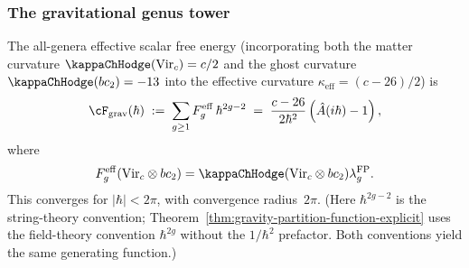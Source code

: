 \subsubsection*{The gravitational genus tower}

\begin{theorem}
\label{thm:gravity-genus-convergence}
The all-genera effective scalar free energy (incorporating both
the matter curvature $\kappaChHodge(\mathrm{Vir}_c) = c/2$ and the
ghost curvature $\kappaChHodge(bc_2) = -13$ into the effective
curvature $\kappa_{\mathrm{eff}} = (c-26)/2$) is
\begin{equation}\label{eq:gravity-all-genera}
\cF_{\mathrm{grav}}(\hbar)
\;:=\;
\sum_{g \ge 1}
F_g^{\mathrm{eff}}\,\hbar^{2g-2}
\;=\;
\frac{c-26}{2\hbar^2}
\left(
 \hat A(i\hbar) - 1
\right),
\end{equation}
where
\[
F_g^{\mathrm{eff}}(\mathrm{Vir}_c\otimes bc_2)
= \kappaChHodge(\mathrm{Vir}_c\otimes bc_2)\lambda_g^{\mathrm{FP}}.
\]
This
converges for $|\hbar| < 2\pi$, with convergence radius~$2\pi$.
\textup{(}Here $\hbar^{2g-2}$ is the string-theory convention;
Theorem~\textup{\ref{thm:gravity-partition-function-explicit}}
uses the field-theory convention $\hbar^{2g}$ without the
$1/\hbar^2$ prefactor. Both conventions yield the same generating
function.\textup{)}
\end{theorem}

